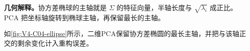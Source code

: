 \documentclass[UTF8,a4paper,11pt,openany]{ctexbook}
\begin{document}
\setcounter{page}{615}
\setcounter{chapter}{27}
\setcounter{figure}{0}
\pagestyle{headings}
\begin{geometrybox}
\textbf{几何解释。}协方差椭球的主轴就是 $\Sigma$ 的特征向量，半轴长度与 $\sqrt{\lambda_i}$ 成正比。PCA 把坐标轴旋转到椭球主轴，再保留最长的主轴。
\end{geometrybox}
如\cref{fig:V4-C04-ellipse}所示，二维PCA保留协方差椭圆的最长主轴，并把与该轴正交的剩余变化计入重构误差。

\end{document}
